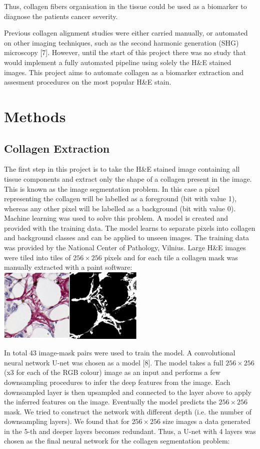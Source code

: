 \documentclass{article}
\begin{document}
Thus, collagen fibers organisation in the tissue could be used as a biomarker
to diagnose the patients cancer severity.

Previous collagen alignment studies were either carried manually, or automated on other imaging
techniques, such as the second harmonic generation (SHG) microscopy [7]. However, until the start
of this project there was no study that would implement a fully automated pipeline using solely
the H\&E stained images. This project aims to automate collagen as a biomarker extraction and
assesment procedures on the most popular H\&E stain.

\section{Methods}

\subsection{Collagen Extraction}

The first step in this project is to take the H\&E stained image containing
all tissue components and extract only the shape of a collagen present
in the image. This is known as the image segmentation problem. In this case
a pixel representing the collagen will be labelled as a foreground (bit with value 1),
whereas any other pixel will be labelled as a background (bit with value 0). Machine learning
was used to solve this problem. A model is created and provided with the training data.
The model learns to separate pixels into collagen and background classes
and can be applied to unseen images. The training data was provided by the National Center of
Pathology, Vilnius. Large H\&E images were tiled into tiles of $256 \times 256$ pixels and for
each tile a collagen mask was manually extracted with a paint software: \\

\includegraphics[width=7cm]{images/pair.png}

In total 43 image-mask pairs were used to train the model. A convolutional neural network U-net
was chosen as a model [8]. The model takes a full $256 \times 256$ (x3 for each of the RGB colour)
image as an input and performs a few downsampling procedures to infer the
deep features from the image. Each downsampled layer is then upsampled and
connected to the layer above to apply the inferred features on the image.
Eventually the model predicts the $256 \times 256$ mask. 
We tried to construct the network with different depth (i.e. the number of downsampling layers).
We found that for $256 \times 256$ size images a data generated in the 5-th and deeper layers
becomes redundant. Thus, a U-net with 4 layers was chosen as the final neural network for the
collagen segmentation problem: \\
\end{document}
